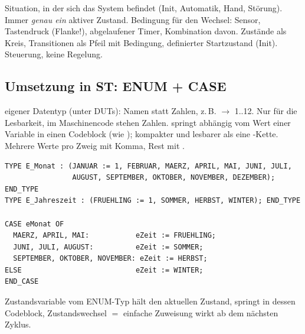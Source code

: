 \label{sec:automaten}

 Situation, in der sich das System befindet (Init,
Automatik, Hand, Störung). Immer \emph{genau ein} aktiver Zustand.
 Bedingung für den Wechsel: Sensor, Tastendruck (Flanke!),
abgelaufener Timer, Kombination davon.
 Zustände als Kreis, Transitionen als Pfeil mit Bedingung,
definierter Startzustand (Init). Steuerung, keine Regelung.

\subsection{Umsetzung in ST: ENUM + CASE}
 eigener Datentyp (unter DUTs): Namen statt Zahlen, z.\,B.
 $\to$ 1..12. Nur für die Lesbarkeit, im
Maschinencode stehen Zahlen.
 springt abhängig vom Wert einer Variable in einen Codeblock
(wie ); kompakter und lesbarer als eine -Kette.
Mehrere Werte pro Zweig mit Komma, Rest mit .
\begin{lstlisting}
TYPE E_Monat : (JANUAR := 1, FEBRUAR, MAERZ, APRIL, MAI, JUNI, JULI,
                AUGUST, SEPTEMBER, OKTOBER, NOVEMBER, DEZEMBER);
END_TYPE
TYPE E_Jahreszeit : (FRUEHLING := 1, SOMMER, HERBST, WINTER); END_TYPE

CASE eMonat OF
  MAERZ, APRIL, MAI:           eZeit := FRUEHLING;
  JUNI, JULI, AUGUST:          eZeit := SOMMER;
  SEPTEMBER, OKTOBER, NOVEMBER: eZeit := HERBST;
ELSE                           eZeit := WINTER;
END_CASE
\end{lstlisting}
 Zustandsvariable vom ENUM-Typ hält den aktuellen Zustand,
 springt in dessen Codeblock, Zustandswechsel $=$ einfache
Zuweisung  \ra wirkt ab dem nächsten Zyklus.

